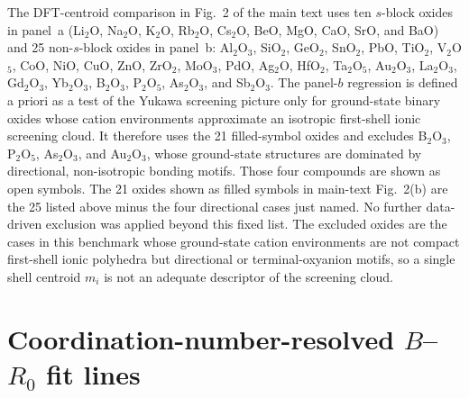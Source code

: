 \documentclass[aps,prmaterials,twocolumn,10pt,superscriptaddress,floatfix]{revtex4-2}
\providecommand{\texorpdfstring}[2]{#1}
\begin{document}
The DFT-centroid comparison in Fig.~2 of the main text uses ten $s$-block oxides in
panel~a (Li$_2$O, Na$_2$O, K$_2$O, Rb$_2$O, Cs$_2$O, BeO, MgO, CaO,
SrO, and BaO) and 25 non-$s$-block oxides in panel~b: Al$_2$O$_3$,
SiO$_2$, GeO$_2$, SnO$_2$, PbO, TiO$_2$, V$_2$O$_5$, CoO, NiO, CuO,
ZnO, ZrO$_2$, MoO$_3$, PdO, Ag$_2$O, HfO$_2$, Ta$_2$O$_5$, Au$_2$O$_3$,
La$_2$O$_3$, Gd$_2$O$_3$, Yb$_2$O$_3$, B$_2$O$_3$, P$_2$O$_5$,
As$_2$O$_3$, and Sb$_2$O$_3$.  The panel-$b$ regression is defined
a priori as a test of the Yukawa screening picture only for
ground-state binary oxides whose cation environments approximate an
isotropic first-shell ionic screening cloud.  It therefore uses the 21
filled-symbol oxides and excludes B$_2$O$_3$, P$_2$O$_5$,
As$_2$O$_3$, and Au$_2$O$_3$, whose ground-state structures are dominated by
directional, non-isotropic bonding motifs.  Those four compounds are shown
as open symbols.  The 21 oxides shown as filled symbols in main-text Fig.~2(b)
are the 25 listed above minus the four directional cases just named.
No further data-driven exclusion was applied beyond this fixed list.  The excluded oxides are the cases in this benchmark whose
ground-state cation environments are not compact first-shell ionic
polyhedra but directional or terminal-oxyanion motifs, so a single
shell centroid $m_i$ is not an adequate descriptor of the screening
cloud.

\section{\texorpdfstring{Coordination-number-resolved $B$--$R_0$ fit lines}{Coordination-number-resolved B-R0 fit lines}}
\end{document}
